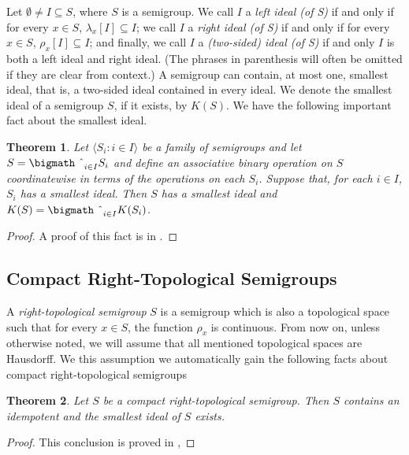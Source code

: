 \documentclass[12pt]{article}
\theoremstyle{plain}
\newtheorem{thm}{Theorem}[section]
\theoremstyle{definition}
\newcommand{\la}{\langle}
\newcommand{\ra}{\rangle}
\newcommand{\bigtimes}{\hbox{\bigmath \char'2}}
\begin{document}
Let $\emptyset \ne I \subseteq S$, where $S$ is a semigroup.
We call $I$ a \textsl{left ideal (of S)} if and only if for every $x
\in S$, $\lambda_x[I] \subseteq I$; we call $I$ a \textsl{right ideal
  (of S)} if and only if for every $x \in S$, $\rho_x[I] \subseteq
I$; and finally, we call $I$ a \textsl{(two-sided) ideal (of S)} if
and only $I$ is both a left ideal and right ideal. 
(The phrases in parenthesis will often be omitted if they are clear
from context.)
A semigroup can contain, at most one, smallest ideal, that is, a
two-sided ideal contained in every ideal.
We denote the smallest ideal of a semigroup $S$, if it exists, by
$K(S)$. 
We have the following important fact about the smallest ideal.
\begin{thm}
  Let $\la S_i : i \in I \ra$ be a family of semigroups and let $S =
  \bigtimes_{i \in I} S_i$ and define an associative binary operation
  on $S$ coordinatewise in terms of the operations on each $S_i$.
  Suppose that, for each $i \in I$, $S_i$ has a smallest ideal.
  Then $S$ has a smallest ideal and $K(S) = \bigtimes_{i \in I}
  K(S_i)$. 
\end{thm}
\begin{proof}
  A proof of this fact is in \cite[Theorem 2.23]{Hindman:1998fk}.
\end{proof}

\subsection{Compact Right-Topological Semigroups}
A \textsl{right-topological semigroup} $S$ is a semigroup which is
also a topological space such that for every $x \in S$, the function
$\rho_x$ is continuous. 
From now on, unless otherwise noted, we will assume that all mentioned
topological spaces are Hausdorff. 
We this assumption we automatically gain the following facts about
compact right-topological semigroups

\begin{thm}
  \label{thm:IdK_S}
  Let $S$ be a compact right-topological semigroup.
  Then $S$ contains an idempotent and the smallest ideal of $S$ exists.
\end{thm}
\begin{proof}
  This conclusion is proved in \cite[Theorem2.5]{Hindman:1998fk}
  \cite[Theorem 2.8]{Hindman:1998fk},
\end{proof}
\end{document}
